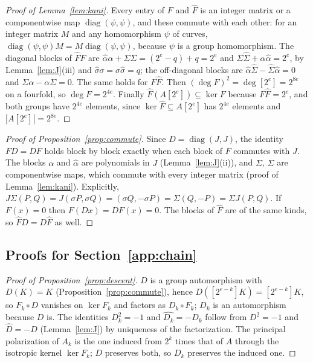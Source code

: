 \documentclass[version=preprint]{iacrcc}
\begin{document}
    \begin{proof}[Proof of Lemma~\ref{lem:kani}]
        Every entry of $F$ and $\widehat{F}$ is an integer matrix or a
        componentwise map $\operatorname{diag}(\psi, \psi)$, and these commute with
        each other: for an integer matrix $M$ and any homomorphism $\psi$ of
        curves, $\operatorname{diag}(\psi, \psi) M = M \operatorname{diag}(\psi,
        \psi)$, because $\psi$ is a group homomorphism. The diagonal blocks of
        $\widehat{F} F$ are $\widehat{\alpha}\alpha + \widehat{\Sigma}\Sigma =
        (2^e - q) + q = 2^e$ and $\Sigma\widehat{\Sigma} + \alpha\widehat{\alpha}
        = 2^e$, by Lemma~\ref{lem:J}(iii) and $\widehat{\sigma}\sigma =
        \sigma\widehat{\sigma} = q$; the off-diagonal blocks are
        $\widehat{\alpha}\widehat{\Sigma} - \widehat{\Sigma}\widehat{\alpha} = 0$
        and $\Sigma\alpha - \alpha\Sigma = 0$. The same holds for
        $F\widehat{F}$. Then $(\deg F)^2 = \deg [2^e] = 2^{8e}$ on a fourfold, so
        $\deg F = 2^{4e}$. Finally $\widehat{F}(A[2^e]) \subseteq \ker F$ because
        $F\widehat{F} = 2^e$, and both groups have $2^{4e}$ elements, since
        $\ker \widehat{F} \subseteq A[2^e]$ has $2^{4e}$ elements and
        $|A[2^e]| = 2^{8e}$.
    \end{proof}

    \begin{proof}[Proof of Proposition~\ref{prop:commute}]
        Since $D = \operatorname{diag}(J, J)$, the identity $FD = DF$ holds block
        by block exactly when each block of $F$ commutes with $J$. The blocks
        $\alpha$ and $\widehat{\alpha}$ are polynomials in $J$
        (Lemma~\ref{lem:J}(ii)), and $\Sigma$, $\widehat{\Sigma}$ are componentwise
        maps, which commute with every integer matrix (proof of
        Lemma~\ref{lem:kani}). Explicitly, $J\Sigma(P, Q) = J(\sigma P, \sigma Q)
        = (\sigma Q, -\sigma P) = \Sigma(Q, -P) = \Sigma J(P, Q)$. If $F(x) = 0$
        then $F(D x) = D F(x) = 0$. The blocks of $\widehat F$ are of the same
        kinds, so $\widehat F D = D \widehat F$ as well.
    \end{proof}

    \subsection*{Proofs for Section~\ref{app:chain}}

    \begin{proof}[Proof of Proposition~\ref{prop:descent}]
        $D$ is a group automorphism with $D(K) = K$
        (Proposition~\ref{prop:commute}), hence $D([2^{e-k}]K) = [2^{e-k}]K$, so
        $F_k \circ D$ vanishes on $\ker F_k$ and factors as $D_k \circ F_k$; $D_k$
        is an automorphism because $D$ is. The identities $D_k^2 = -1$ and
        $\widehat{D_k} = -D_k$ follow from $D^2 = -1$ and $\widehat{D} = -D$
        (Lemma~\ref{lem:J}) by uniqueness of the factorization. The principal
        polarization of $A_k$ is the one induced from $2^k$ times that of $A$
        through the isotropic kernel $\ker F_k$; $D$ preserves both, so $D_k$
        preserves the induced one.
    \end{proof}
\end{document}
